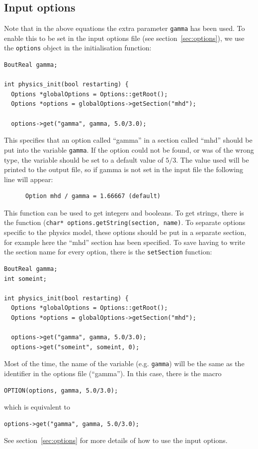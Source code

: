\documentclass[12pt]{article}
\newcommand{\code}[1]{\texttt{#1}}
\begin{document}
\subsection{Input options}
%
\label{sec:inputopts}
%
%
Note that in the above equations the extra parameter \code{gamma} has been
used. To enable this to be set in the input options file (see
section~\ref{sec:options}), we use the \code{options} object in the
initialisation function:
%
\begin{lstlisting}
BoutReal gamma;

int physics_init(bool restarting) {
  Options *globalOptions = Options::getRoot();
  Options *options = globalOptions->getSection("mhd");

  options->get("gamma", gamma, 5.0/3.0);
\end{lstlisting}
%
This specifies that an option called ``gamma'' in a section called ``mhd''
should be put into the variable \code{gamma}. If the option could not be found,
or was of the wrong type, the variable should be set to a default value of
$5/3$.  The value used will be printed to the output file, so if gamma is not
set in the input file the following line will appear:
%
\begin{verbatim}
      Option mhd / gamma = 1.66667 (default)
\end{verbatim}
%
This function can be used to get integers and booleans. To get strings, there
is the function (\code{char* options.getString(section, name)}.  To separate
options specific to the physics model, these options should be put in a
separate section, for example here the ``mhd'' section has been specified. To
save having to write the section name for every option, there is the
\code{setSection} function:
%
\begin{lstlisting}
BoutReal gamma;
int someint;

int physics_init(bool restarting) {
  Options *globalOptions = Options::getRoot();
  Options *options = globalOptions->getSection("mhd");

  options->get("gamma", gamma, 5.0/3.0);
  options->get("someint", someint, 0);
\end{lstlisting}
%
Most of the time, the name of the variable (e.g. \code{gamma}) will be the same
as the identifier in the options file (``gamma''). In this case, there is the
macro
%
\begin{lstlisting}[numbers=none]
OPTION(options, gamma, 5.0/3.0);
\end{lstlisting}
%
which is equivalent to
%
\begin{lstlisting}[numbers=none]
options->get("gamma", gamma, 5.0/3.0);
\end{lstlisting}
%
See section~\ref{sec:options} for more details of how to use the input options.
\end{document}

